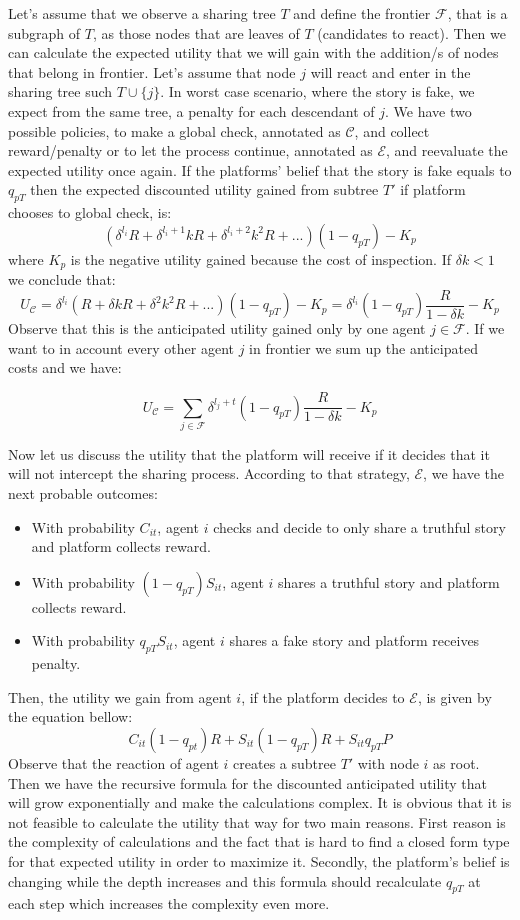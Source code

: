 Let's assume that we observe a sharing tree $T$ and define the frontier $\mathcal{F}$, that is a subgraph of $T$, as those nodes that are leaves of $T$ (candidates to react). Then we can calculate the expected utility that we will gain with the addition/s of nodes that belong in frontier. Let's assume that node $j$ will react and enter in the sharing tree such $T \cup \{j\}$. In worst case scenario, where the story is fake, we expect from the same tree, a penalty for each descendant of $j$. We have two possible policies, to make a global check, annotated as $\mathcal{C}$, and collect reward/penalty or to let the process continue, annotated as $\mathcal{E}$, and reevaluate the expected utility once again. If the platforms' belief that the story is fake equals to $q_{pT}$ then the expected discounted utility gained from subtree $T'$ if platform chooses to global check, is: 
$$ (\delta^{l_i} R + \delta^{l_i+1} k R + \delta^{l_i+2} k^2 R+...) (1-q_{pT}) - K_p $$
where $K_p$ is the negative utility gained because the cost of inspection. If $\delta k <1 $ we conclude that:
$$ U_{\mathcal{C}} =\delta^{l_i} (R+ \delta k R+\delta^2 k^2 R+...)(1-q_{pT}) - K_p = \delta^{l_i}(1-q_{pT}) \frac{R}{1-\delta k}-K_p$$
Observe that this is the anticipated utility gained only by one agent $j \in \mathcal{F}$. If we want to in account every other agent $j$ in frontier we sum up the anticipated costs and we have:

$$ U_{\mathcal{C}} = \sum_{j \in \mathcal{F}} \delta^{l_j+t}(1-q_{pT}) \frac{R}{1-\delta k}-K_p$$

Now let us discuss the utility that the platform will receive if it decides that it will not intercept the sharing process. According to that strategy, $\mathcal{E}$, we have the next probable outcomes:

\begin{itemize}
	\item With probability $C_{it}$, agent $i$ checks and decide to only share a truthful story and platform collects reward.
	\item With probability $(1-q_{pT}) S_{it}$, agent $i$ shares a truthful story and platform collects reward.
	\item With probability $q_{pT} S_{it}$, agent $i$ shares a fake story and platform receives penalty.
\end{itemize}

Then, the utility we gain from agent $i$, if the platform decides to $\mathcal{E}$, is given by the equation bellow:
$$C_{it}(1-q_{pt})R + S_{it}(1-q_{pT})R + S_{it} q_{pT} P$$
Observe that the reaction of agent $i$ creates a subtree $T'$ with node $i$ as root. Then we have the recursive formula for the discounted anticipated utility that will grow exponentially and make the calculations complex. It is obvious that it is not feasible to calculate the utility that way for two main reasons. First reason is the complexity of calculations and the fact that is hard to find a closed form type for that expected utility in order to maximize it. Secondly, the platform's belief is changing while the depth increases and this formula should recalculate $q_{pT} $ at each step which increases the complexity even more.

